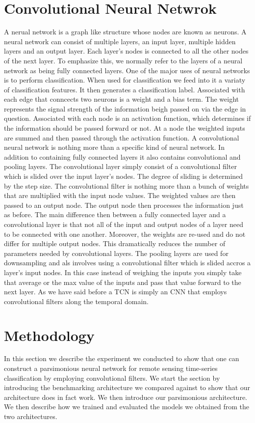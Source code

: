 \documentclass{article}
\begin{document}
 \section{Convolutional Neural Netwrok}
 A nerual network is a graph like structure whose nodes are known as neurons. A neural network can consist of multiple layers, an input layer, multiple hidden layers and an output layer. Each layer's nodes is connected to all the other nodes of the next layer. To emphasize this, we normally refer to the layers of a neural network as being fully connected layers. One of the major uses of neural networks is to perform classification. When used for classification we feed into it a variaty of classification features. It then generates a classification label. Associated with each edge that conncects two neurons is a weight and a bias term. The weight represents the signal strength of the information beigh passed on via the edge in question. Associated with each node is an activation function, which determines if the information should be passed forward or not. At a node the weighted inputs are summed and then passed through the activation function. A convolutional neural network is nothing more than a specific kind of neural network. In addition to containing fully connected layers it also contains convolutional and pooling layers. The convolutional layer simply consist of a convolutional filter which is slided over the input layer's nodes. The degree of sliding is determined by the step size. The convolutional filter is nothing more than a bunch of weights that are multiplied with the input node values. The weighted values are then passed to an output node. The output node then processes the information just as before. The main difference then between a fully connected layer and a convolutional layer is that not all of the input and output nodes of a layer need to be connected with one another. Moreover, the weights are re-used and do not differ for multiple output nodes. This dramatically reduces the number of parameters needed by convolutional layers. The pooling layers are used for downsampling and als involves using a convolutional filter which is slided accros a layer's input nodes. In this case instead of weighing the inputs you simply take that average or the max value of the inputs and pass that value forward to the next layer. As we have said before a TCN is simply an CNN that employs convolutional filters along the temporal domain. 
 
\section{Methodology}
\label{sec:exp}
In this section we describe the experiment we conducted to show that one can construct a parsimonious neural network for remote sensing time-series classification by employing convolutional filters. We start the section by introducing the benchmarking architecture we compared against to show that our architecture does in fact work. We then introduce our parsimonious architecture. We then describe how we trained and evaluated the models we obtained from the two architectures. 
\end{document}
